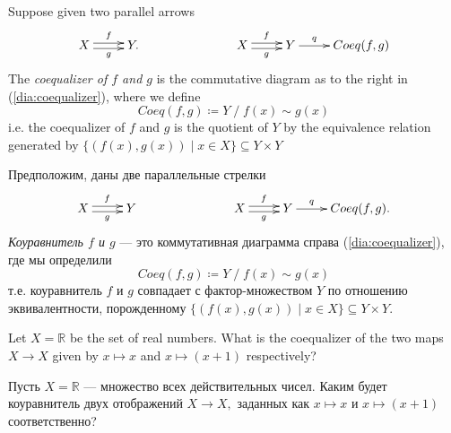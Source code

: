 \documentclass[../main/CT4S-EN-RU]{subfiles}
\begin{document}

\subsection{}

\begin{definitionENG}[Coequalizer]\label{def:coequalizer}
Suppose given two parallel arrows 
\begin{align}\label{dia:coequalizer}
\xymatrix{X\ar@<.5ex>[r]^f\ar@<-.5ex>[r]_g&Y.}\hspace{1in}\xymatrix{X\ar@<.5ex>[r]^f\ar@<-.5ex>[r]_g&Y\ar[r]^-q&Coeq(f,g)}
\end{align}
The {\em coequalizer of $f$ and $g$} is the commutative diagram as to the right in (\ref{dia:coequalizer}), where we define $$Coeq(f,g){\coloneqq}Y\;/\;f(x)\sim g(x)$$ i.e. the coequalizer of $f$ and $g$ is the quotient of $Y$ by the equivalence relation generated by $\{(f(x),g(x)){\;|\;}x\in X\}\subseteq Y\times Y$
\end{definitionENG}

\begin{definitionRUS}[Коуравнитель]\label{def:coequalizer}
Предположим, даны две параллельные стрелки 
\begin{align}\label{dia:coequalizer}
\xymatrix{X\ar@<.5ex>[r]^f\ar@<-.5ex>[r]_g&Y}\hspace{1in}\xymatrix{X\ar@<.5ex>[r]^f\ar@<-.5ex>[r]_g&Y\ar[r]^-q&Coeq(f,g).}
\end{align}
{\em Коуравнитель $f$ и $g$} — это коммутативная диаграмма справа (\ref{dia:coequalizer}), где мы определили $$Coeq(f,g){\coloneqq}Y\;/\;f(x)\sim g(x)$$ т.е. коуравнитель $f$ и $g$ совпадает с фактор-множеством $Y$ по отношению эквивалентности, порожденному $\{(f(x),g(x)){\;|\;}x\in X\}\subseteq Y\times Y.$
\end{definitionRUS}

\begin{exerciseENG}
Let $X={ℝ}$ be the set of real numbers. What is the coequalizer of the two maps $X{→} X$ given by $x\mapsto x$ and $x\mapsto (x+1)$ respectively?
\end{exerciseENG}

\begin{exerciseRUS}
Пусть $X={ℝ}$ — множество всех действительных чисел. Каким будет коуравнитель двух отображений $X{→} X,$ заданных как $x\mapsto x$ и $x\mapsto (x+1)$ соответственно?
\end{exerciseRUS}
\end{document}
